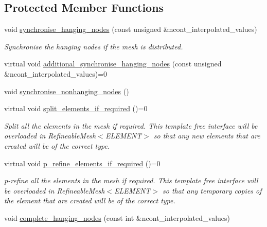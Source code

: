 \subsection*{Protected Member Functions}
\begin{DoxyCompactItemize}
\item 
void \hyperlink{classoomph_1_1TreeBasedRefineableMeshBase_a0ba902eb4b63aaa8c4da1aadcf25709a}{synchronise\+\_\+hanging\+\_\+nodes} (const unsigned \&ncont\+\_\+interpolated\+\_\+values)
\begin{DoxyCompactList}\small\item\em Synchronise the hanging nodes if the mesh is distributed. \end{DoxyCompactList}\item 
virtual void \hyperlink{classoomph_1_1TreeBasedRefineableMeshBase_a59d0404f8e5ebd7199f25c794c5c715c}{additional\+\_\+synchronise\+\_\+hanging\+\_\+nodes} (const unsigned \&ncont\+\_\+interpolated\+\_\+values)=0
\item 
void \hyperlink{classoomph_1_1TreeBasedRefineableMeshBase_ac6091e7d077cf416f296b95f086efe55}{synchronise\+\_\+nonhanging\+\_\+nodes} ()
\item 
virtual void \hyperlink{classoomph_1_1TreeBasedRefineableMeshBase_a86dace1f78991fb9b401a31215df89ef}{split\+\_\+elements\+\_\+if\+\_\+required} ()=0
\begin{DoxyCompactList}\small\item\em Split all the elements in the mesh if required. This template free interface will be overloaded in Refineable\+Mesh$<$\+E\+L\+E\+M\+E\+N\+T$>$ so that any new elements that are created will be of the correct type. \end{DoxyCompactList}\item 
virtual void \hyperlink{classoomph_1_1TreeBasedRefineableMeshBase_a9a2f26f447d6386505bdbdd0ac518321}{p\+\_\+refine\+\_\+elements\+\_\+if\+\_\+required} ()=0
\begin{DoxyCompactList}\small\item\em p-\/refine all the elements in the mesh if required. This template free interface will be overloaded in Refineable\+Mesh$<$\+E\+L\+E\+M\+E\+N\+T$>$ so that any temporary copies of the element that are created will be of the correct type. \end{DoxyCompactList}\item 
void \hyperlink{classoomph_1_1TreeBasedRefineableMeshBase_aab6f14b0933edc819231a88b1d555f62}{complete\+\_\+hanging\+\_\+nodes} (const int \&ncont\+\_\+interpolated\+\_\+values)

\end{DoxyCompactItemize}
